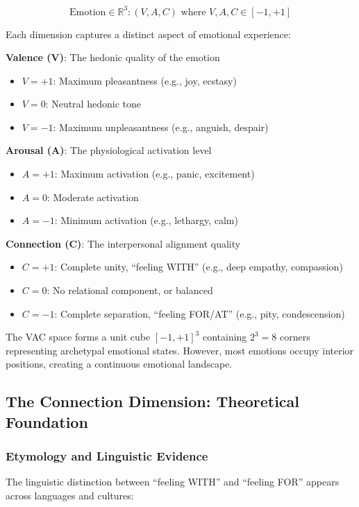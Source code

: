 \documentclass[10pt,twocolumn]{article}
\begin{document}
$$\text{Emotion} \in \mathbb{R}^3: (V, A, C) \text{ where } V, A, C \in [-1, +1]$$

Each dimension captures a distinct aspect of emotional experience:

\textbf{Valence (V)}: The hedonic quality of the emotion
\begin{itemize}
    \item $V = +1$: Maximum pleasantness (e.g., joy, ecstasy)
    \item $V = 0$: Neutral hedonic tone
    \item $V = -1$: Maximum unpleasantness (e.g., anguish, despair)
\end{itemize}

\textbf{Arousal (A)}: The physiological activation level
\begin{itemize}
    \item $A = +1$: Maximum activation (e.g., panic, excitement)
    \item $A = 0$: Moderate activation
    \item $A = -1$: Minimum activation (e.g., lethargy, calm)
\end{itemize}

\textbf{Connection (C)}: The interpersonal alignment quality
\begin{itemize}
    \item $C = +1$: Complete unity, ``feeling WITH'' (e.g., deep empathy, compassion)
    \item $C = 0$: No relational component, or balanced
    \item $C = -1$: Complete separation, ``feeling FOR/AT'' (e.g., pity, condescension)
\end{itemize}

The VAC space forms a unit cube $[-1, +1]^3$ containing $2^3 = 8$ corners representing archetypal emotional states. However, most emotions occupy interior positions, creating a continuous emotional landscape.

\subsection{The Connection Dimension: Theoretical Foundation}

\subsubsection{Etymology and Linguistic Evidence}

The linguistic distinction between ``feeling WITH'' and ``feeling FOR'' appears across languages and cultures:
\end{document}
